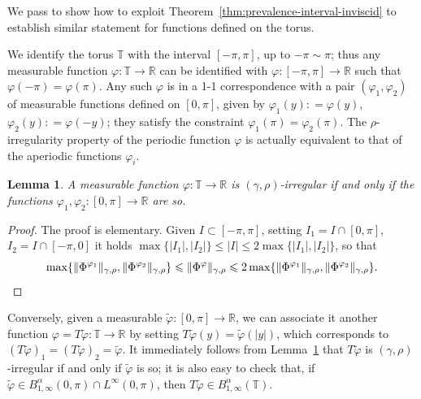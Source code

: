 \documentclass[11pt,oneside,reqno]{amsart}
\newtheorem{lemma}[theorem]{Lemma}
\numberwithin{equation}{section}
\begin{document}
We pass to show how to exploit Theorem~\ref{thm:prevalence-interval-inviscid}
to establish similar statement for functions defined on the torus.

We identify the torus $\mathbb{T}$ with the interval $[- \pi, \pi]$, up to $-
\pi \sim \pi$; thus any measurable function $\varphi : \mathbb{T} \rightarrow
\mathbb{R}$ can be identified with $\varphi : [- \pi, \pi] \rightarrow
\mathbb{R}$ such that $\varphi (- \pi) = \varphi (\pi)$. Any such $\varphi$ is
in a 1-1 correspondence with a pair $(\varphi_1, \varphi_2)$ of measurable
functions defined on $[0, \pi]$, given by $\varphi_1 (y) : = \varphi (y)$,
$\varphi_2 (y) : = \varphi (- y)$; they satisfy the constraint $\varphi_1
(\pi) = \varphi_2 (\pi)$. The $\rho$-irregularity property of the periodic
function $\varphi$ is actually equivalent to that of the aperiodic functions
$\varphi_i$.

\begin{lemma}
  \label{lem:techlem-rho}A measurable function $\varphi : \mathbb{T}
  \rightarrow \mathbb{R}$ is $(\gamma, \rho)$-irregular if and only if the
  functions $\varphi_1, \varphi_2 : [0, \pi] \rightarrow \mathbb{R}$ are so.
\end{lemma}

\begin{proof}
  The proof is elementary. Given $I \subset [- \pi, \pi]$, setting $I_1 = I
  \cap [0, \pi]$, $I_2 = I \cap [- \pi, 0]$ it holds $\max \{ | I_1 |, | I_2 |
  \} \leqslant | I | \leqslant 2 \max \{ | I_1 |, | I_2 | \}$, so that
  \[ \max \{ \| \Phi^{\varphi_1} \|_{\gamma, \rho}, \| \Phi^{\varphi_2}
     \|_{\gamma, \rho} \} \leqslant \| \Phi^{\varphi} \|_{\gamma, \rho}
     \leqslant 2 \max \{ \| \Phi^{\varphi_1} \|_{\gamma, \rho}, \|
     \Phi^{\varphi_2} \|_{\gamma, \rho} \} . \qedhere \]
\end{proof}

Conversely, given a measurable $\tilde{\varphi} : [0, \pi] \rightarrow
\mathbb{R}$, we can associate it another function $\varphi = T \tilde{\varphi}
: \mathbb{T} \rightarrow \mathbb{R}$ by setting $T \tilde{\varphi} (y) =
\tilde{\varphi} (| y |)$, which corresponds to $(T \tilde{\varphi})_1 = (T
\tilde{\varphi})_2 = \tilde{\varphi} $. It immediately follows from
Lemma~\ref{lem:techlem-rho} that $T \tilde{\varphi}$ is $(\gamma,
\rho)$-irregular if and only if $\tilde{\varphi}$ is so; it is also easy to
check that, if $\tilde{\varphi} \in B^{\alpha}_{1, \infty} (0, \pi) \cap
L^{\infty} (0, \pi)$, then $T \tilde{\varphi} \in B^{\alpha}_{1, \infty}
(\mathbb{T})$.
\end{document}

